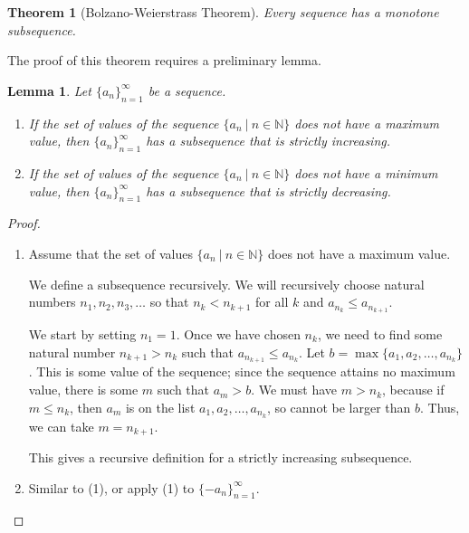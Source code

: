 \documentclass[12pt]{amsart}
\newcommand{\N}{\mathbb{N}}
\numberwithin{equation}{section}
\theoremstyle{plain} %
\newtheorem{thm}[equation]{Theorem}
\newtheorem{lem}[equation]{Lemma}
\theoremstyle{definition}
\theoremstyle{remark}
\begin{document}
\begin{thm}[Bolzano-Weierstrass Theorem]\label{thm214}
Every sequence has a monotone subsequence.
\end{thm}



The proof of this theorem requires a preliminary lemma.



\begin{lem} \label{lem214a} Let $\{a_n\}_{n=1}^\infty$ be a sequence.
\begin{enumerate}
\item If the set of values of the sequence  $\{a_n \ | \ n\in \N\}$ does not have a maximum value, then $\{a_n\}_{n=1}^\infty$ has a subsequence that is strictly increasing. 
 \item If the set of values of the sequence  $\{a_n \ | \ n\in \N\}$ does not have a minimum value, then $\{a_n\}_{n=1}^\infty$ has a subsequence that is strictly decreasing. 
\end{enumerate}
\end{lem}

\begin{proof}
\begin{enumerate}
\item Assume that the set of values $\{a_n \ | \ n\in \N\}$ does not have a maximum value.

We define a subsequence recursively. We will recursively choose natural numbers $n_1, n_2, n_3,\dots$ so that $n_k < n_{k+1}$ for all $k$ and $a_{n_k} \leq a_{n_{k+1}}$.

We start by setting $n_1 = 1$. Once we have chosen $n_k$, we need to find some natural number $n_{k+1}>n_k$ such that $a_{n_{k+1}} \leq a_{n_k}$. Let $b=\max\{a_1,a_2,\dots,a_{n_k}\}$. This is some value of the sequence; since the sequence attains no maximum value, there is some $m$ such that $a_m>b$. We must have $m>n_k$, because if $m\leq n_k$, then $a_m$ is on the list $a_1,a_2,\dots,a_{n_k}$, so cannot be larger than $b$. Thus, we can take $m=n_{k+1}$.

This gives a recursive definition for a strictly increasing subsequence.
\item Similar to (1), or apply (1) to $\{-a_n\}_{n=1}^\infty$.\qedhere
\end{enumerate}
\end{proof}
\end{document}
